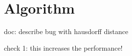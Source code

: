 \section{Algorithm}

doc: describe bug with hausdorff distance

check 1: this increases the performance!